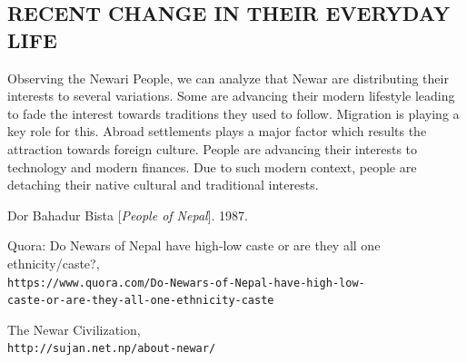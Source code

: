 \documentclass[a4paper,13pt, margin=0.9in]{article}
\begin{document}
\begin{flushleft}
	\newpage
	\section{RECENT CHANGE IN THEIR EVERYDAY LIFE}
	Observing the Newari People, we can analyze that Newar are distributing their interests to several variations. Some are advancing their modern lifestyle leading to fade the interest towards traditions they used to follow. Migration is playing a key role for this. Abroad settlements plays a major factor which results the attraction towards foreign culture. People are advancing their interests to technology and modern finances. Due to such modern context, people are detaching their native cultural and traditional interests.



	\newpage

	\begin{thebibliography}{9}

		Dor Bahadur Bista
			[\textit{People of Nepal}].
		1987.

		Quora: Do Newars of Nepal have high-low caste or are they all one ethnicity/caste?,
		\\\texttt{https://www.quora.com/Do-Newars-of-Nepal-have-high-low- \\ caste-or-are-they-all-one-ethnicity-caste}

		The Newar Civilization,
		\\\texttt{http://sujan.net.np/about-newar/}

	\end{thebibliography}

\end{flushleft}
\end{document}
